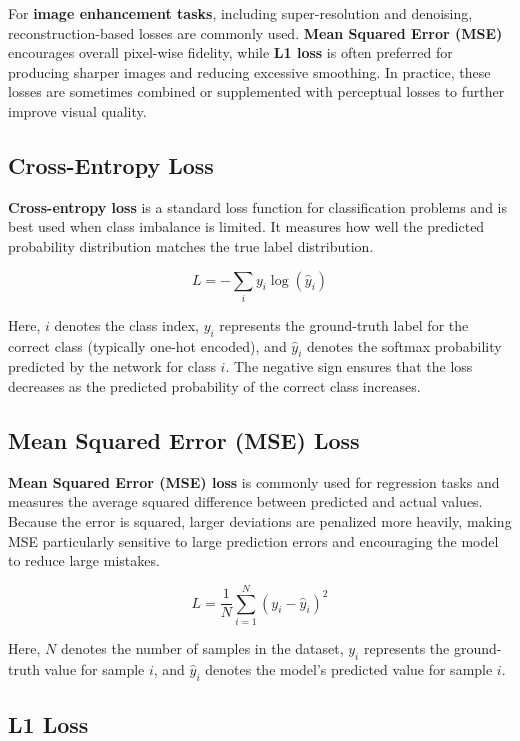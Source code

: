 \documentclass{article}
\begin{document}
For \textbf{image enhancement tasks}, including super-resolution and denoising, reconstruction-based losses are commonly used. \textbf{Mean Squared Error (MSE)} encourages overall pixel-wise fidelity, while \textbf{L1 loss} is often preferred for producing sharper images and reducing excessive smoothing. In practice, these losses are sometimes combined or supplemented with perceptual losses to further improve visual quality.


\subsection{Cross-Entropy Loss}

\textbf{Cross-entropy loss} is a standard loss function for classification problems and is best used when class imbalance is limited. It measures how well the predicted probability distribution matches the true label distribution.

\[
L = - \sum_{i} y_i \log(\hat{y}_i)
\]

Here, \(i\) denotes the class index, \(y_i\) represents the ground-truth label for the correct class (typically one-hot encoded), and \(\hat{y}_i\) denotes the softmax probability predicted by the network for class \(i\). The negative sign ensures that the loss decreases as the predicted probability of the correct class increases.
    
\subsection{Mean Squared Error (MSE) Loss}

\textbf{Mean Squared Error (MSE) loss} is commonly used for regression tasks and measures the average squared difference between predicted and actual values. Because the error is squared, larger deviations are penalized more heavily, making MSE particularly sensitive to large prediction errors and encouraging the model to reduce large mistakes.

\[
L = \frac{1}{N} \sum_{i=1}^{N} (y_i - \hat{y}_i)^2
\]

Here, \(N\) denotes the number of samples in the dataset, \(y_i\) represents the ground-truth value for sample \(i\), and \(\hat{y}_i\) denotes the model’s predicted value for sample \(i\).

\subsection{L1 Loss}
\end{document}

